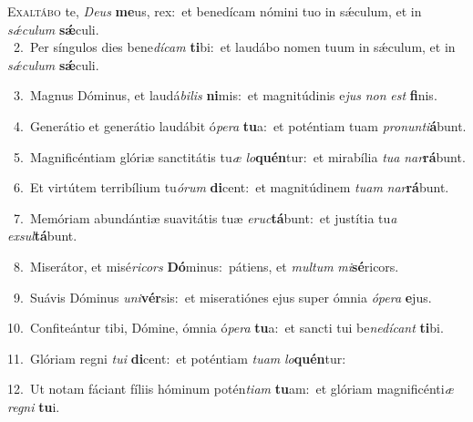 \lettrine{\initial\textcolor{\initialcolor}{E}}{xaltábo} te, \textit{De}\-\textit{us} \textbf{me}\-us, rex:~\star et benedícam nómini tuo in sǽculum, et in \textit{sǽ}\-\textit{cu}\textit{lum} \textbf{sǽ}\-culi.\\
{\numbfont\textcolor{\numbcolor}{~2.}}~Per síngulos dies bene\-\textit{dí}\-\textit{cam} \textbf{ti}\-bi:~\star et laudábo nomen tuum in sǽculum, et in \textit{sǽ}\-\textit{cu}\textit{lum} \textbf{sǽ}\-culi.\par
{\numbfont\textcolor{\numbcolor}{~3.}}~Magnus Dóminus, et laudá\-\textit{bi}\-\textit{lis} \textbf{ni}\-mis:~\star et magnitúdinis e\textit{jus} \textit{non} \textit{est} \textbf{fi}\-nis.\par
{\numbfont\textcolor{\numbcolor}{~4.}}~Generátio et generátio laudábit ó\-\textit{pe}\-\textit{ra} \textbf{tu}\-a:~\star et poténtiam tuam \textit{pro}\-\textit{nun}\textit{ti}\textbf{á}bunt.\par
{\numbfont\textcolor{\numbcolor}{~5.}}~Magnificéntiam glóriæ sanctitátis tu\textit{æ} \textit{lo}\-\textbf{quén}tur:~\star et mirabília \textit{tu}\-\textit{a} \textit{nar}\-\textbf{rá}bunt.\par
{\numbfont\textcolor{\numbcolor}{~6.}}~Et virtútem terribílium tu\-\textit{ó}\-\textit{rum} \textbf{di}\-cent:~\star et magnitúdinem \textit{tu}\-\textit{am} \textit{nar}\-\textbf{rá}bunt.\par
{\numbfont\textcolor{\numbcolor}{~7.}}~Memóriam abundántiæ suavitátis tuæ \textit{e}\-\textit{ruc}\textbf{tá}bunt:~\star et justítia tu\textit{a} \textit{ex}\-\textit{sul}\textbf{tá}bunt.\par
{\numbfont\textcolor{\numbcolor}{~8.}}~Miserátor, et misé\-\textit{ri}\-\textit{cors} \textbf{Dó}\-minus:~\star pátiens, et \textit{mul}\-\textit{tum} \textit{mi}\-\textbf{sé}ricors.\par
{\numbfont\textcolor{\numbcolor}{~9.}}~Suávis Dóminus \textit{u}\-\textit{ni}\textbf{vér}sis:~\star et miseratiónes ejus super ómnia \textit{ó}\-\textit{pe}\textit{ra} \textbf{e}\-jus.\par
{\numbfont\textcolor{\numbcolor}{10.}}~Confiteántur tibi, Dómine, ómnia ó\-\textit{pe}\-\textit{ra} \textbf{tu}\-a:~\star et sancti tui be\-\textit{ne}\-\textit{dí}\textit{cant} \textbf{ti}\-bi.\par
{\numbfont\textcolor{\numbcolor}{11.}}~Glóriam regni \textit{tu}\-\textit{i} \textbf{di}\-cent:~\star et poténtiam \textit{tu}\-\textit{am} \textit{lo}\-\textbf{quén}tur:\par
{\numbfont\textcolor{\numbcolor}{12.}}~Ut notam fáciant fíliis hóminum potén\-\textit{ti}\-\textit{am} \textbf{tu}\-am:~\star et glóriam magnificénti\textit{æ} \textit{re}\-\textit{gni} \textbf{tu}\-i.\par
